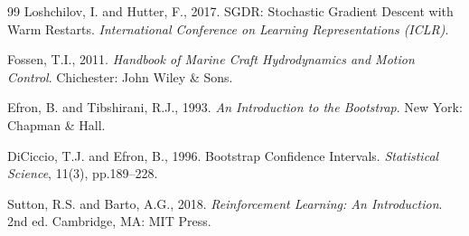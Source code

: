 \begin{thebibliography}{99}
Loshchilov, I. and Hutter, F., 2017.
SGDR: Stochastic Gradient Descent with Warm Restarts.
\textit{International Conference on Learning Representations (ICLR)}.

Fossen, T.I., 2011.
\textit{Handbook of Marine Craft Hydrodynamics and Motion Control}.
Chichester: John Wiley \& Sons.

Efron, B. and Tibshirani, R.J., 1993.
\textit{An Introduction to the Bootstrap}. New York: Chapman \& Hall.

DiCiccio, T.J. and Efron, B., 1996.
Bootstrap Confidence Intervals.
\textit{Statistical Science}, 11(3), pp.189--228.

Sutton, R.S. and Barto, A.G., 2018.
\textit{Reinforcement Learning: An Introduction}. 2nd ed. Cambridge, MA: MIT Press.

\end{thebibliography}
